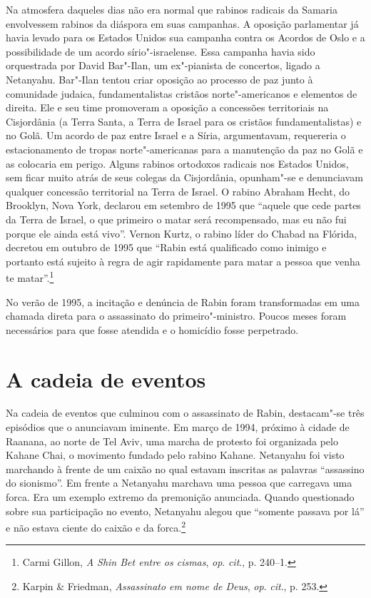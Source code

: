 Na atmosfera daqueles dias não era normal que rabinos radicais da
Samaria envolvessem rabinos da diáspora em suas campanhas. A oposição
parlamentar já havia levado para os Estados Unidos sua campanha contra
os Acordos de Oslo e a possibilidade de um acordo sírio"-israelense. Essa
campanha havia sido orquestrada por David Bar"-Ilan, um ex"-pianista de
concertos, ligado a Netanyahu. Bar"-Ilan tentou criar oposição ao
processo de paz junto à comunidade judaica, fundamentalistas cristãos
norte"-americanos e elementos de direita. Ele e seu time promoveram
a oposição a concessões territoriais na Cisjordânia (a Terra Santa, a
Terra de Israel para os cristãos fundamentalistas) e no Golã. Um acordo
de paz entre Israel e a Síria, argumentavam, requereria o estacionamento
de tropas norte"-americanas para a manutenção da paz no Golã e as
colocaria em perigo. Alguns rabinos ortodoxos radicais nos Estados
Unidos, sem ficar muito atrás de seus colegas da Cisjordânia, opunham"-se
e denunciavam qualquer concessão territorial na Terra de Israel. O
rabino Abraham Hecht, do Brooklyn, Nova York, declarou em setembro de
1995 que ``aquele que cede partes da Terra de Israel, o que primeiro o
matar será recompensado, mas eu não fui porque ele ainda está vivo''.
Vernon Kurtz, o rabino líder do Chabad na Flórida, decretou em outubro de 1995
que ``Rabin está qualificado como inimigo e portanto está sujeito à
regra de agir rapidamente para matar a pessoa que venha te
matar''.\footnote{Carmi Gillon, \emph{A Shin Bet entre os cismas}, 
\emph{op}. \emph{cit}., p. 240--1.}

No verão de 1995, a incitação e denúncia de Rabin foram transformadas em
uma chamada direta para o assassinato do primeiro"-ministro. Poucos meses
foram necessários para que fosse atendida e o homicídio fosse
perpetrado.

\section{A cadeia de eventos}

Na cadeia de eventos que culminou com o assassinato de Rabin,
destacam"-se três episódios que o anunciavam iminente. Em março de 1994,
próximo à cidade de Raanana, ao norte de Tel Aviv, uma marcha de protesto
foi organizada pelo Kahane Chai, o movimento fundado pelo rabino Kahane.
Netanyahu foi visto marchando à frente de um caixão no qual estavam
inscritas as palavras ``assassino do sionismo''. Em frente a Netanyahu
marchava uma pessoa que carregava uma forca. Era um exemplo extremo da
premonição anunciada. Quando questionado sobre sua participação no
evento, Netanyahu alegou que ``somente passava por lá'' e não estava
ciente do caixão e da forca.\footnote{Karpin \& Friedman, 
\emph{Assassinato em nome de Deus}, \emph{op}. \emph{cit}., p. 253.}

